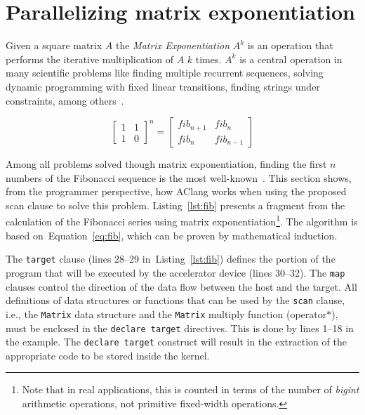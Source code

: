 \documentclass[Ingles]{ic-tese-v1}
\newcommand{\req}[1]{Equation~\ref{eq:#1}}
\newcommand{\ttt}[1]{{\texttt{#1}}}
\newcommand{\rlst}[1]{Listing~\ref{lst:#1}}
\begin{document}
\section{Parallelizing matrix exponentiation}
\label{sec:fibonacci}

Given a square matrix $A$ the \textit{Matrix Exponentiation} $A^k$ is an operation 
that performs the iterative multiplication of $A$ $k$ times. $A^k$ is a central 
operation in many scientific problems like finding multiple recurrent sequences, 
solving dynamic programming with fixed linear transitions, finding strings under 
constraints, among others~\cite{doi:10}. 

\begin{equation}
\begin{bmatrix}1 & 1 \\ 1 & 0\end{bmatrix}^{n}
= \begin{bmatrix}fib_{n+1} & fib_{n}\\fib_{n} &
fib_{n-1}\end{bmatrix}
\label{eq:fib}
\end{equation}

Among all problems solved though matrix exponentiation, finding the first $n$
numbers of the Fibonacci sequence is the most well-known~\cite{fibonacci}.
This section shows, from the programmer perspective,    how AClang works   when 
using the proposed scan clause to solve this problem. \rlst{fib}  presents a
fragment from  the calculation  of the  Fibonacci series  using matrix
exponentiation\footnote{Note  that  in   real  applications,  this  is
	counted in terms of the  number of \textit{bigint} arithmetic operations, not
	primitive  fixed-width  operations.}. The algorithm  is  based  on~\req{fib}, 
which can be proven by mathematical induction.  

The \ttt{target} clause (lines 28--29 in~\rlst{fib}) defines the portion of the
program  that will  be  executed by  the  accelerator device  (lines
30--32).  The \ttt{map}  clauses control the direction  of the data flow
between the host and the  target. All definitions of data structures
or functions  that can be used  by the \ttt{scan} clause,  i.e., the
\ttt{Matrix} data  structure and the \ttt{Matrix}  multiply function
(operator$*$),  must   be  enclosed  in  the   \ttt{declare  target}
directives. This is done by lines 1--18 in the example.  The \ttt{declare  target} 
construct  will result in  the extraction of  the appropriate
code to be stored inside the kernel.  
\end{document}

